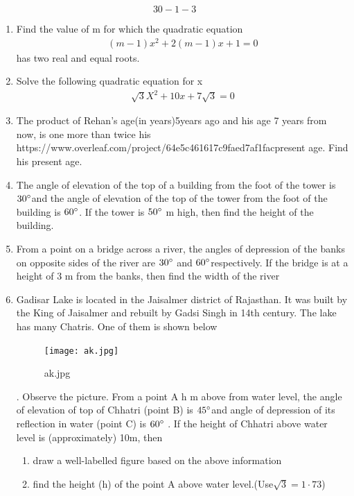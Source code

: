 \documentclass{article}
\begin{document}
\maketitle
              $$30-1-3$$
              \begin{enumerate}
                  \item Find the value of m for which the quadratic equation \begin{align}
                      (m-1)x^2+2(m-1)x+1=0
                  \end{align} has two real and equal roots. 
                  \item Solve the following quadratic equation for x 
                  \begin{align}
                      \sqrt{3}X^2+10x+7\sqrt{3}=0
                  \end{align}
                  \item  The product of Rehan's age(in years)5years ago and his age 7 years from now, is one more than twice his https://www.overleaf.com/project/64e5c461617c9faed7af1facpresent age. Find his present age.
                  \item The angle of elevation of the top of a building from the foot of the tower is $30\degree$and the angle of elevation of the top of the tower from the foot of the building is $60\degree$. If the tower is $50\degree$ m high, then find the height of the building.
                 \item From a point on a bridge across a river, the angles of depression of the banks on opposite sides of the river are $30\degree$ and $60\degree$respectively. If the bridge is at a height of 3 m from the banks, then find the width of the river 
                 \item Gadisar Lake is located in the Jaisalmer district of Rajasthan. It was built by the King of Jaisalmer and rebuilt by Gadsi Singh in 14th century. The lake has many Chatris. One of them is shown below
\begin{figure}[htbp]
\centering
\texttt{[image: ak.jpg]}
\caption{ak.jpg}
\end{figure}.
Observe the picture. From a point A h m above from water level, the 
angle of elevation of top of Chhatri (point B) is $45\degree$and angle of 
depression of its reflection in water (point C) is $60\degree$ . If the height of 
Chhatri above water level is (approximately) 10m, then 
\begin{enumerate}
\item draw a well-labelled figure based on the above information
\item find the height (h) of the point A above water level.(Use$\sqrt{3}=1·73$) 
\end{enumerate}
\end{enumerate}
\end{document}
